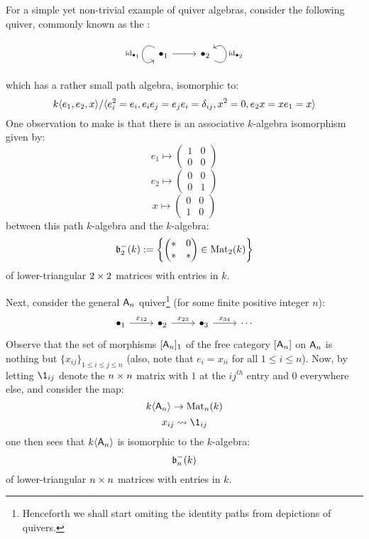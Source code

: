            \begin{example} \label{example: path_algebras_of_A_n_quivers}
                For a simple yet non-trivial example of quiver algebras, consider the following quiver, commonly known as the :
                    $$
                        \begin{tikzcd}
                            {\bullet_1} \arrow["\id_{\bullet_1}"', loop, distance=2em, in=215, out=145] \arrow[r] & {\bullet_2} \arrow["\id_{\bullet_2}"', loop, distance=2em, in=35, out=325]
                        \end{tikzcd}
                    $$
                which has a rather small path algebra, isomorphic to:
                    $$k\langle e_1, e_2, x\rangle/\langle e_i^2 = e_i, e_i e_j = e_j e_i = \delta_{ij}, x^2 = 0, e_2 x = x e_1 = x\rangle$$
                One observation to make is that there is an associative $k$-algebra isomorphism given by:
                    $$e_1 \mapsto \begin{pmatrix} 1 & 0 \\ 0 & 0 \end{pmatrix}$$
                    $$e_2 \mapsto \begin{pmatrix} 0 & 0 \\ 0 & 1 \end{pmatrix}$$
                    $$x \mapsto \begin{pmatrix} 0 & 0 \\ 1 & 0 \end{pmatrix}$$
                between this path $k$-algebra and the $k$-algebra:
                    $$\mathfrak{b}_2^-(k) := \left\{ \begin{pmatrix} * & 0 \\ * & * \end{pmatrix} \in \mathrm{Mat}_2(k) \right\}$$
                of lower-triangular $2 \x 2$ matrices with entries in $k$.
                    
                Next, consider the general $\mathsf{A}_n$ quiver\footnote{Henceforth we shall start omiting the identity paths from depictions of quivers.} (for some finite positive integer $n$):
                    $$
                        \begin{tikzcd}
                        	{\bullet_1} & {\bullet_2} & {\bullet_3} & \cdots
                        	\arrow["{x_{12}}", from=1-1, to=1-2]
                        	\arrow["{x_{23}}", from=1-2, to=1-3]
                        	\arrow["{x_{34}}", from=1-3, to=1-4]
                        \end{tikzcd}
                    $$
                Observe that the set of morphisms $[\mathsf{A}_n]_1$ of the free category $[\mathsf{A}_n]$ on $\mathsf{A}_n$ is nothing but $\{x_{ij}\}_{1 \leq i \leq j \leq n}$ (also, note that $e_i = x_{ii}$ for all $1 \leq i \leq n$). Now, by letting $\1_{ij}$ denote the $n \x n$ matrix with $1$ at the $ij^{th}$ entry and $0$ everywhere else, and consider the map:
                    $$k\langle\mathsf{A}_n\rangle \to \mathrm{Mat}_n(k)$$
                    $$x_{ij} \mapsto \1_{ij}$$
                one then sees that $k\langle\mathsf{A}_n\rangle$ is isomorphic to the $k$-algebra:
                    $$\mathfrak{b}_n^-(k)$$
                of lower-triangular $n \x n$ matrices with entries in $k$.
            \end{example}
